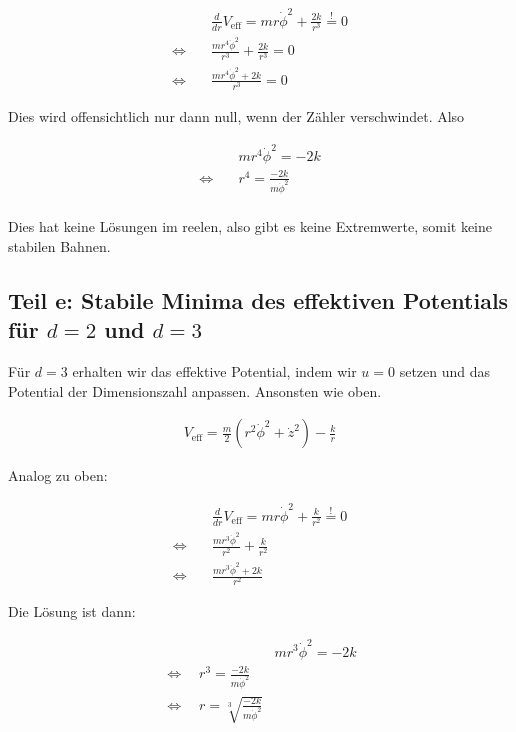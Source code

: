 \documentclass[a4paper,german,12pt,smallheadings]{scrartcl}
\begin{document}
\begin{align*}
  &\frac{d}{dr} V_{\text{eff}} = mr\dot{\phi}^2 + \frac{2k}{r^3} \overset{!}{=} 0 \\
  \Leftrightarrow\quad&\frac{mr^4\dot{\phi}^2}{r^3} + \frac{2k}{r^3}=0\\
  \Leftrightarrow\quad&\frac{mr^4\dot{\phi}^2 + 2k}{r^3}=0
\end{align*}

Dies wird offensichtlich nur dann null, wenn der Zähler verschwindet. Also

\begin{align*}
  &mr^4\dot{\phi}^2 = -2k \\
  \Leftrightarrow\quad &r^4 = \frac{-2k}{m\dot{\phi}^2} \\
\end{align*}

Dies hat keine Lösungen im reelen, also gibt es keine Extremwerte, somit keine stabilen Bahnen.

\subsection*{Teil e: Stabile Minima des effektiven Potentials für $d=2$ und $d=3$}

Für $d = 3$ erhalten wir das effektive Potential, indem wir $u = 0$ setzen und
das Potential der Dimensionszahl anpassen. Ansonsten wie oben.

\begin{align*}
  V_{\text{eff}} = \frac{m}{2}(r^2\dot{\phi}^2 + \dot{z}^2) - \frac{k}{r}
\end{align*}

Analog zu oben:

\begin{align*}
  &\frac{d}{dr} V_{\text{eff}} = mr\dot{\phi}^2 + \frac{k}{r^2} \overset{!}{=} 0 \\
  \Leftrightarrow\quad&\frac{mr^3\dot{\phi}^2}{r^2} + \frac{k}{r^2} \\
  \Leftrightarrow\quad&\frac{mr^3\dot{\phi}^2 + 2k}{r^2}
\end{align*}

Die Lösung ist dann:

\begin{align*}
  &mr^3\dot{\phi}^2 = -2k \\
  \Leftrightarrow\quad r^3 = \frac{-2k}{m\dot{\phi}^2} \\
  \Leftrightarrow\quad r = \sqrt[3]{\frac{-2k}{m\dot{\phi}^2}}
\end{align*}
\end{document}
